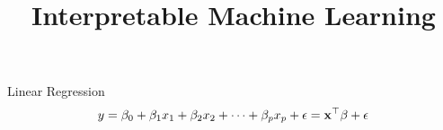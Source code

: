 \documentclass[11pt,compress,t,notes=noshow, aspectratio=169, xcolor=table]{beamer}
\title{Interpretable Machine Learning}
\date{}
\begin{document}
\newcommand{\titlefigure}{figure/whitebox}
\newcommand{\learninggoals}{
\item Interpretation of main effects
\item Inclusion of interactions and polynomials 
\item Regularization via LASSO
}





\begin{frame}[c]{Linear Regression}
$$y = \beta_0 + \beta_1 x_1 + \beta_2 x_2 + \dots + \beta_p x_p + \epsilon = \xv^\top \beta + \epsilon$$


\end{frame}
\end{document}

